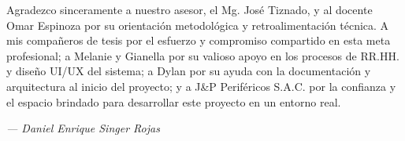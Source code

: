 Agradezco sinceramente a nuestro asesor, el Mg. José Tiznado, 
y al docente Omar Espinoza por su orientación metodológica y retroalimentación técnica. 
A mis compañeros de tesis por el esfuerzo y compromiso compartido en esta meta profesional; 
a Melanie y Gianella por su valioso apoyo en los procesos de RR.HH. y diseño UI/UX del sistema; 
a Dylan por su ayuda con la documentación y arquitectura al inicio del proyecto; 
y a J\&P Periféricos S.A.C. 
por la confianza y el espacio brindado para desarrollar este proyecto en un entorno real.

\begin{flushright}
    \small\textit{--- Daniel Enrique Singer Rojas}
\end{flushright}
